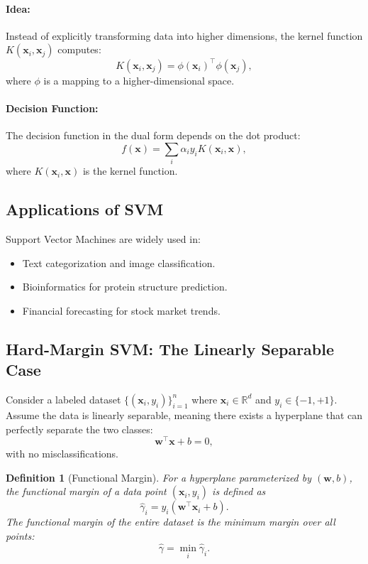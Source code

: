 \documentclass[12pt,a4paper]{article}
\newtheorem{definition}{Definition}
\begin{document}
\paragraph{Idea:}
Instead of explicitly transforming data into higher dimensions, the kernel function $K(\mathbf{x}_i, \mathbf{x}_j)$ computes:
\[
K(\mathbf{x}_i, \mathbf{x}_j) = \phi(\mathbf{x}_i)^\top \phi(\mathbf{x}_j),
\]
where $\phi$ is a mapping to a higher-dimensional space.

\paragraph{Decision Function:}
The decision function in the dual form depends on the dot product:
\[
f(\mathbf{x}) = \sum_{i} \alpha_i y_i K(\mathbf{x}_i, \mathbf{x}),
\]
where $K(\mathbf{x}_i, \mathbf{x})$ is the kernel function.

\subsection{Applications of SVM}
Support Vector Machines are widely used in:
\begin{itemize}
    \item Text categorization and image classification.
    \item Bioinformatics for protein structure prediction.
    \item Financial forecasting for stock market trends.
\end{itemize}


\subsection{Hard-Margin SVM: The Linearly Separable Case}
Consider a labeled dataset $\{(\mathbf{x}_i,y_i)\}_{i=1}^n$ where $\mathbf{x}_i \in \mathbb{R}^d$ and $y_i \in \{-1,+1\}$. Assume the data is linearly separable, meaning there exists a hyperplane that can perfectly separate the two classes:
\[
\mathbf{w}^\top \mathbf{x} + b = 0,
\]
with no misclassifications.

\begin{definition}[Functional Margin]
For a hyperplane parameterized by $(\mathbf{w},b)$, the functional margin of a data point $(\mathbf{x}_i,y_i)$ is defined as
\[
\hat{\gamma}_i = y_i(\mathbf{w}^\top \mathbf{x}_i + b).
\]
The functional margin of the entire dataset is the minimum margin over all points:
\[
\hat{\gamma} = \min_{i} \hat{\gamma}_i.
\]
\end{definition}
\end{document}

